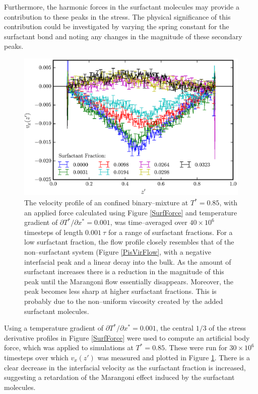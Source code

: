 Furthermore, the harmonic forces in the surfactant molecules may provide a contribution to these peaks in the stress.
The physical significance of this contribution could be investigated by varying the spring constant for the surfactant bond and noting any changes in the magnitude of these secondary peaks.
\FloatBarrier

\begin{figure}[h!]
\centering
\includegraphics[scale=1.0]{SurfFlow}
\caption{The velocity profile of an confined binary--mixture at $T^{*}=0.85$, with an applied force calculated using Figure \ref{SurfForce} and temperature gradient of $\partial T^{*} / \partial x^{*} = 0.001$, was time--averaged over $40 \times 10^{6}$ timesteps of length $0.001\ \tau$ for a range of surfactant fractions.
For a low surfactant fraction, the flow profile closely resembles that of the non--surfactant system (Figure \ref{PisVirFlow}, with a negative interfacial peak and a linear decay into the bulk.
As the amount of surfactant increases there is a reduction in the magnitude of this peak until the Marangoni flow essentially disappears.
Moreover, the peak becomes less sharp at higher surfactant fractions.
This is probably due to the non--uniform viscosity created by the added surfactant molecules.
}
\label{SurfFlow}
\end{figure}
Using a temperature gradient of $\partial T^{*} / \partial x^{*} = 0.001$, the central $1/3$ of the stress derivative profiles in Figure \ref{SurfForce} were used to compute an artificial body force, which was applied to simulations at $T^{*}=0.85$.
These were run for $30 \times 10^{6}$ timesteps over which $v_{x}(z')$ was measured and plotted in Figure \ref{SurfFlow}.
There is a clear decrease in the interfacial velocity as the surfactant fraction is increased, suggesting a retardation of the Marangoni effect induced by the surfactant molecules.

